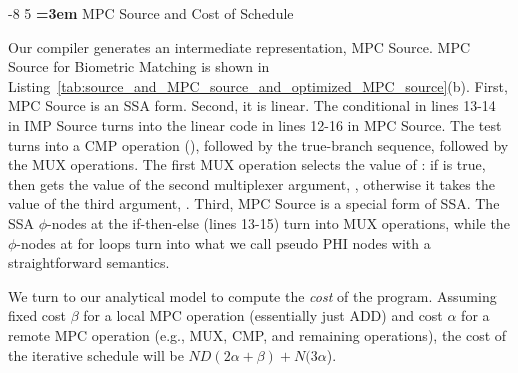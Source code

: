 \documentclass[sigconf, screen, natbib=false, dvipsnames, table]{acmart}
\makeatletter
\renewcommand{\subsection}{\@startsection{subsection}{2}{\z@}%
                        {-8\p@ \@plus -4\p@ \@minus -4\p@}%
                        {5\p@ \@plus 2\p@ \@minus 2\p@}%
                        {\normalfont\Large\bfseries\boldmath
                         \rightskip=\z@ \@plus 3em\pretolerance=10000 }}
\theoremstyle{definition}
\makeatother
\begin{document}
\subsection{MPC Source and Cost of Schedule}

Our compiler generates an intermediate representation, MPC Source. MPC Source 
for Biometric Matching is shown in 
Listing~\ref{tab:source_and_MPC_source_and_optimized_MPC_source}(b). First, MPC Source is an SSA form. 
Second, it is linear. The conditional in lines 13-14 in IMP Source turns into the linear code in lines 12-16 in MPC Source. 
The test turns into a CMP operation (), followed by the 
true-branch sequence, followed by the MUX operations. The first MUX operation selects the value
of : if  is true, then  gets the value of the second multiplexer
argument,  , otherwise it takes the value of the third argument, .  
Third, MPC Source is a special form of SSA. The SSA $\phi$-nodes at the if-then-else (lines 13-15) turn into 
MUX operations, while the $\phi$-nodes at for loops turn into what we call pseudo PHI nodes with a straightforward semantics.

We turn to our analytical model to compute the \emph{cost} of the program. Assuming fixed 
cost $\beta$ for a local MPC operation (essentially just ADD) and cost $\alpha$ for a remote
MPC operation (e.g., MUX, CMP, and remaining operations), the cost of the iterative schedule 
will be $ND(2\alpha+\beta) + N(3\alpha$). 
\end{document}
